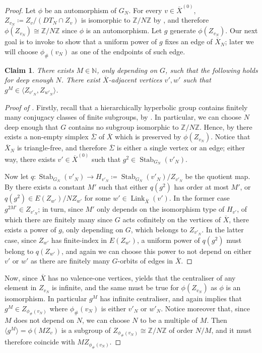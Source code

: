 \documentclass[svgnames]{amsart}
\theoremstyle{plain}
\newtheorem{claim}[thm]{Claim}
\newenvironment{claimproof}{\renewcommand{\qedsymbol}{$\blacksquare$}\begin{proof}}{\end{proof}}
\theoremstyle{definition}
\newcommand{\link}[2]{\operatorname{Link}_{#1}\left(#2\right)}
\newcommand{\N}{\mathbb{N}}
\newcommand{\Z}{\mathbb{Z}}
\newcommand{\Stab}[2]{\operatorname{Stab}_{#1}\left(#2\right)}
\newcommand{\ov}[1]{\overline{#1}}
\begin{document}
\begin{proof} Let $\phi$ be an automorphism of $G_N$. For every $v\in \ov X^{(0)}$, $Z_{v_N}\coloneq Z_v/(DT_N\cap Z_v)$ is isomorphic to $\Z/N\Z$ by , and therefore $\phi(Z_{v_N})\cong \Z/N\Z$ since $\phi$ is an automorphism. Let $g$ generate $\phi(Z_{v_N})$. Our next goal is to invoke  to show that a uniform power of $g$ fixes an edge of $\ov X_N$; later we will choose $\phi_{\#}(v_N)$ as one of the endpoints of such edge. 

    \begin{claim}\label{claim:extracting_edge} There exists $M\in \N$, only depending on $G$, such that the following holds for deep enough $N$. There exist $\ov X$-adjacent vertices $v',w'$ such that $g^{M}\in \langle Z_{v'_N}, Z_{w'_N}\rangle$.
    \end{claim}

    \begin{claimproof}[Proof of ]
    Firstly, recall that a hierarchically hyperbolic group contains finitely many conjugacy classes of finite subgroups, by \cite[Theorem G]{HHP:coarse}. In particular, we can choose $N$ deep enough that $G$ contains no subgroup isomorphic to $\Z/N\Z$. Hence, by  there exists a non-empty simplex $\ov\Sigma$ of $\ov X$ which is preserved by $\phi(Z_{v_N})$. Notice that $\ov X_N$ is triangle-free, and therefore $\ov \Sigma$ is either a single vertex or an edge; either way, there exists $v'\in \ov X^{(0)}$ such that $g^2\in \Stab{G_N}{v'_N}$. 

Now let $q\colon \Stab{G_N}{v'_N}\to H_{v'_N}\coloneq \Stab{G_N}{v'_N}/Z_{v'_N}$ be the quotient map. By  there exists a constant $M'$ such that either $q(g^2)$ has order at most $M'$, or $q(g^2)\in E(Z_{w'})/NZ_{w'}$ for some $w'\in \link{\ov X}{v'}$. In the former case $g^{2M'}\in Z_{v'_N}$; in turn, since $M'$ only depends on the isomorphism type of $H_{v'}$, of which there are finitely many since $G$ acts cofinitely on the vertices of $\ov X$, there exists a power of $g$, only depending on $G$, which belongs to $Z_{v'_N}$. In the latter case, since $Z_{w'}$ has finite-index in $E(Z_{w'})$, a uniform power of $q(g^2)$ must belong to $q(Z_{w'})$, and again we can choose this power to not depend on either $v'$ or $w'$ as there are finitely many $G$-orbits of edges in $\ov X$. 
\end{claimproof}
\noindent Now, since $\ov X$ has no valence-one vertices,  yields that the centraliser of any element in $Z_{v_N}$ is infinite, and the same must be true for $\phi(Z_{v_N})$ as $\phi$ is an isomorphism. In particular $g^M$ has infinite centraliser, and again   implies that $g^{M}\in Z_{\phi_{\#}(v_N)}$ where $\phi_{\#}(v_N)$ is either $v'_N$ or $w'_N$. Notice moreover that, since $M$ does not depend on $N$, we can choose $N$ to be a multiple of $M$. Then $\langle g^M\rangle=\phi(MZ_v)$ is a subgroup of $Z_{\phi_{\#}(v_N)}\cong \Z/N\Z$ of order $N/M$, and it must therefore coincide with $MZ_{\phi_{\#}(v_N)}$. 


\end{proof}
\end{document}
